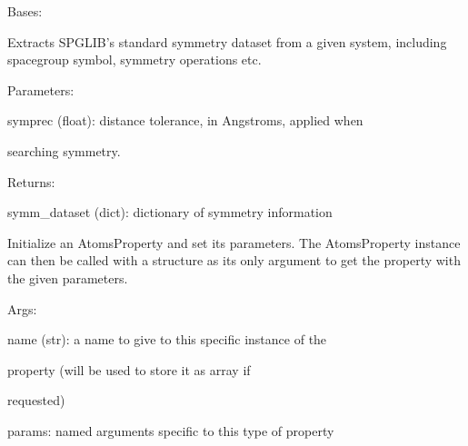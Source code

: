 \documentclass[letterpaper,10pt,english]{sphinxmanual}
\begin{document}
\begin{fulllineitems}
\label{doctree/soprano.properties.symmetry.symmetry:soprano.properties.symmetry.symmetry.SymmetryDataset}
Bases: {\hyperref[doctree/soprano.properties.atomsproperty:soprano.properties.atomsproperty.AtomsProperty]{\emph{}}}

Extracts SPGLIB's standard symmetry dataset from a given system, including
spacegroup symbol, symmetry operations etc.

\begin{DUlineblock}{0em}
\item[] Parameters:
\item[]
\begin{DUlineblock}{\DUlineblockindent}
\item[] symprec (float): distance tolerance, in Angstroms, applied when
\item[]
\begin{DUlineblock}{\DUlineblockindent}
\item[] searching symmetry.
\end{DUlineblock}
\end{DUlineblock}
\end{DUlineblock}

\begin{DUlineblock}{0em}
\item[] Returns:
\item[]
\begin{DUlineblock}{\DUlineblockindent}
\item[] symm\_dataset (dict): dictionary of symmetry information
\end{DUlineblock}
\end{DUlineblock}

Initialize an AtomsProperty and set its parameters.
The AtomsProperty instance can then be called with a structure as its
only argument to get the property with the given parameters.

\begin{DUlineblock}{0em}
\item[] Args:
\item[]
\begin{DUlineblock}{\DUlineblockindent}
\item[] name (str): a name to give to this specific instance of the
\item[]
\begin{DUlineblock}{\DUlineblockindent}
\item[] property (will be used to store it as array if
\item[] requested)
\end{DUlineblock}
\item[] params: named arguments specific to this type of property
\end{DUlineblock}
\end{DUlineblock}


\end{fulllineitems}
\end{document}
